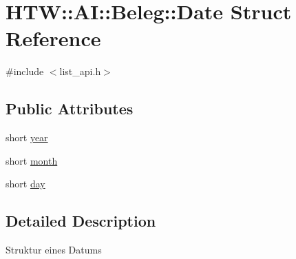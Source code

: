 \hypertarget{struct_h_t_w_1_1_a_i_1_1_beleg_1_1_date}{\section{H\-T\-W\-:\-:A\-I\-:\-:Beleg\-:\-:Date Struct Reference}
\label{struct_h_t_w_1_1_a_i_1_1_beleg_1_1_date}
}


{\ttfamily \#include $<$list\-\_\-api.\-h$>$}

\subsection*{Public Attributes}
\begin{DoxyCompactItemize}
\item 
short \hyperlink{struct_h_t_w_1_1_a_i_1_1_beleg_1_1_date_ae2dfadf9cf5c8a50b57678cf6a122332}{year}
\item 
short \hyperlink{struct_h_t_w_1_1_a_i_1_1_beleg_1_1_date_aa2233967e1888e3433a59d105d339374}{month}
\item 
short \hyperlink{struct_h_t_w_1_1_a_i_1_1_beleg_1_1_date_a45521e5b6c1574069b1e716552f465b1}{day}
\end{DoxyCompactItemize}


\subsection{Detailed Description}
Struktur eines Datums 

